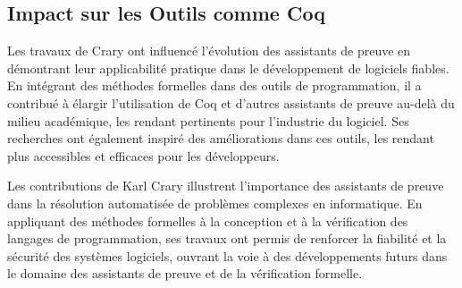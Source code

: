 \subsection{Impact sur les Outils comme Coq}
Les travaux de Crary ont influencé l'évolution des assistants de preuve en démontrant leur applicabilité pratique dans le développement de logiciels fiables. En intégrant des méthodes formelles dans des outils de programmation, il a contribué à élargir l'utilisation de Coq et d'autres assistants de preuve au-delà du milieu académique, les rendant pertinents pour l'industrie du logiciel. Ses recherches ont également inspiré des améliorations dans ces outils, les rendant plus accessibles et efficaces pour les développeurs.

Les contributions de Karl Crary illustrent l'importance des assistants de preuve dans la résolution automatisée de problèmes complexes en informatique. En appliquant des méthodes formelles à la conception et à la vérification des langages de programmation, ses travaux ont permis de renforcer la fiabilité et la sécurité des systèmes logiciels, ouvrant la voie à des développements futurs dans le domaine des assistants de preuve et de la vérification formelle.

